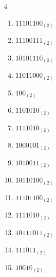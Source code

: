 \begin{multicols}{4}
\begin{enumerate}
        \phantom{$=122$}

  \item $11101100_{(2)}$

        \phantom{$=236$}

\columnbreak %

  \item $11100111_{(2)}$

        \phantom{$=231$}

  \item $10101110_{(2)}$

        \phantom{$=174$}

  \item $11011000_{(2)}$

        \phantom{$=216$}

  \item $100_{(2)}$

        \phantom{$=4$}

  \item $1101010_{(2)}$

        \phantom{$=106$}

  \item $1111010_{(2)}$

        \phantom{$=122$}

  \item $1000101_{(2)}$

        \phantom{$=69$}

  \item $1010011_{(2)}$

        \phantom{$=83$}

  \item $10110100_{(2)}$

        \phantom{$=180$}

  \item $11101100_{(2)}$

        \phantom{$=236$}

  \item $1111010_{(2)}$

        \phantom{$=122$}

  \item $10111011_{(2)}$

        \phantom{$=187$}

  \item $111011_{(2)}$

        \phantom{$=59$}

  \item $10010_{(2)}$


\end{enumerate}
\end{multicols}
